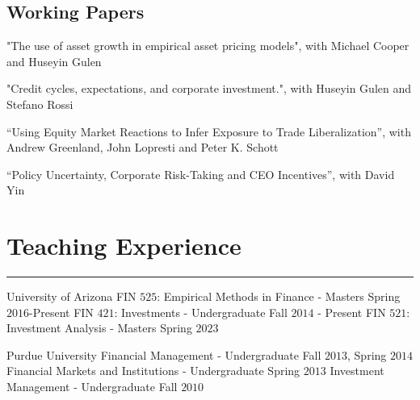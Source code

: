 \documentclass[10pt,letterpaper]{article}
\renewenvironment{itemize}{
  \begin{list}{}{
    \setlength{\leftmargin}{1.5em}
    \setlength{\itemsep}{0.25em}
    \setlength{\parskip}{0pt}
    \setlength{\parsep}{0.25em}
  }
}{
  \end{list}
}
\begin{document}
\subsection*{Working Papers}
\begin{itemize}
\item "The use of asset growth in empirical asset pricing models", with Michael Cooper and Huseyin Gulen 

\bigskip

\item "Credit cycles, expectations, and corporate investment.", with Huseyin Gulen and Stefano Rossi 

\medskip

\item ``Using Equity Market Reactions to Infer Exposure to Trade Liberalization'', with Andrew Greenland, John Lopresti and Peter K. Schott

\medskip

\item ``Policy Uncertainty, Corporate Risk-Taking and CEO Incentives'', with David Yin
\end{itemize}






\section*{Teaching Experience}
\nointerlineskip
\vspace{-3mm}
\rule{\textwidth}{0.5mm}

\begin{itemize}
\item University of Arizona
  \subitem FIN $525$: Empirical Methods in Finance - Masters   \hfill Spring $2016$-Present
  \subitem FIN $421$: Investments - Undergraduate \hfill Fall $2014$ - Present
  \subitem FIN $521$: Investment Analysis - Masters \hfill Spring $2023$

\item Purdue University
  \subitem Financial Management - Undergraduate \hfill Fall $2013$, Spring $2014$
  \subitem Financial Markets and Institutions - Undergraduate \hfill Spring $2013$ 
  \subitem Investment Management - Undergraduate     \hfill Fall $2010$     
 \end{itemize}
\end{document}
